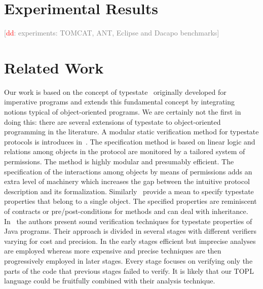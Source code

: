 \documentclass{llncs} %
\newcommand{\noterg}[2]{\textcolor{gray}{[\textcolor{red}{#1}: #2]}}
\newcommand{\dd}[1]{\noterg{dd}{#1}}
\newcommand{\dinocomment}[1]{\dd{#1}}
\begin{document}
\section{Experimental Results}

\dinocomment{experiments: TOMCAT, ANT, Eclipse and Dacapo benchmarks}

\section{Related Work}\label{sec:related} %
Our work is based on the concept of typestate~\cite{strom1986} originally developed for imperative programs and extends this fundamental concept by integrating notions typical of object-oriented programs. 
We are certainly not the first in doing this: there are several extensions of typestate to object-oriented programming in the literature.
A modular static verification method for typestate protocols is introduces in~\cite{dblp:conf/oopsla/bierhoffa07}. 
The specification method is based on linear logic and relations among objects in the protocol are monitored by a tailored system of permissions. 
The method is highly modular and presumably efficient. The specification of the interactions among objects by means of permissions adds an extra level of machinery which increases the gap between the intuitive protocol description and its formalization. Similarly~\cite{deline2004,dblp:conf/sigsoft/BierhoffA05} provide a mean to specify typestate properties that belong to a single object. The specified properties are reminiscent of contracts or pre/post-conditions for methods and
can deal with inheritance.
In~\cite{dblp:conf/issta/FinkYDRG06} the authors present sound verification techniques for typestate properties of Java  programs.
Their approach is divided in several stages with different verifiers varying for cost and precision.
In the early stages efficient but imprecise analyses are employed whereas
more expensive and precise techniques are then progressively employed in later stages.
Every stage focuses on verifying only the parts of the code that previous stages failed to verify.
It is likely that our TOPL language could be fruitfully combined with their analysis technique.
\end{document}
